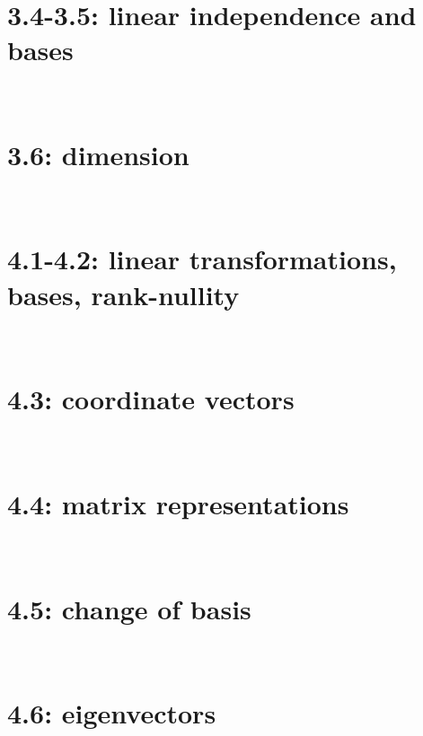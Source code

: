 \documentclass[11pt]{amsart}
\theoremstyle{definition}
\theoremstyle{named}
\numberwithin{myalgctr}{section}
\begin{document}
\setcounter{exercises@solutionnumber}{1}
\ \\
\section*{3.4-3.5: linear independence and bases}  \label{S:basissection}


\setcounter{exercises@solutionnumber}{1}
\ \\
\section*{3.6: dimension}  \label{S:basissection}


\setcounter{exercises@solutionnumber}{1}
\ \\
\section*{4.1-4.2: linear transformations, bases, rank-nullity}  \label{S:basissection}


\setcounter{exercises@solutionnumber}{1}
\ \\
\section*{4.3: coordinate vectors} 


\setcounter{exercises@solutionnumber}{1}
\ \\
\section*{4.4: matrix representations} 


\setcounter{exercises@solutionnumber}{1}
\ \\
\section*{4.5: change of basis} 


\setcounter{exercises@solutionnumber}{1}
\ \\
\section*{4.6: eigenvectors} 


\setcounter{exercises@solutionnumber}{1}
\ \\
\end{document}
